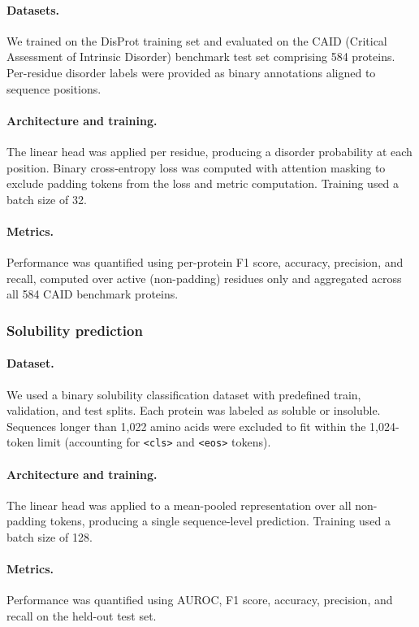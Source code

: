 \paragraph{Datasets.}
We trained on the DisProt training set and evaluated on the CAID (Critical Assessment of Intrinsic Disorder) benchmark test set comprising 584 proteins.
Per-residue disorder labels were provided as binary annotations aligned to sequence positions.

\paragraph{Architecture and training.}
The linear head was applied per residue, producing a disorder probability at each position.
Binary cross-entropy loss was computed with attention masking to exclude padding tokens from the loss and metric computation.
Training used a batch size of 32.

\paragraph{Metrics.}
Performance was quantified using per-protein F1 score, accuracy, precision, and recall, computed over active (non-padding) residues only and aggregated across all 584 CAID benchmark proteins.

\subsubsection{Solubility prediction}

\paragraph{Dataset.}
We used a binary solubility classification dataset with predefined train, validation, and test splits.
Each protein was labeled as soluble or insoluble.
Sequences longer than 1{,}022 amino acids were excluded to fit within the 1{,}024-token limit (accounting for \texttt{<cls>} and \texttt{<eos>} tokens).

\paragraph{Architecture and training.}
The linear head was applied to a mean-pooled representation over all non-padding tokens, producing a single sequence-level prediction.
Training used a batch size of 128.

\paragraph{Metrics.}
Performance was quantified using AUROC, F1 score, accuracy, precision, and recall on the held-out test set.

